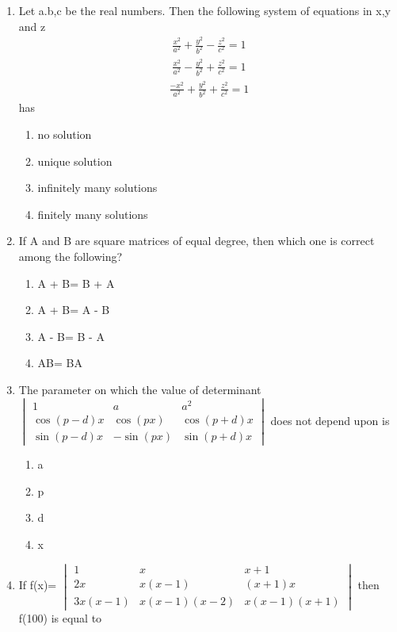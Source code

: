 \begin{enumerate}[label=\arabic*.,ref=\thesubsection.\theenumi]
 \item Let a.b,c be the real numbers. Then the following system of equations in x,y and z
 \begin{align} \frac{x^2}{a^2} +\frac{y^2}{b^2}-\frac{z^2}{c^2} = 1\end{align} 
 \begin{align} \frac{x^2}{a^2}-\frac{y^2}{b^2}+\frac{z^2}{c^2} = 1\end{align}  
 \begin{align} \frac{-x^2}{a^2}+\frac{y^2}{b^2}+\frac{z^2}{c^2} = 1\end{align} has
 \begin{enumerate}
 \item no solution
 \item unique solution
 \item infinitely many solutions 
 \item finitely many solutions
 \end{enumerate}
\item If A and B are square matrices of equal degree, then which one is correct among the following?
\begin{enumerate}
 \item A + B= B + A
 \item A + B= A - B
 \item A - B= B - A
 \item AB= BA
 \end{enumerate}
 \item The parameter on which the value of determinant $\begin{vmatrix} 1 & a & a^2  \\ \cos(p-d)x & \cos(px) & \cos(p+d)x \\ \sin(p-d)x & -\sin(px) & \sin(p+d)x \end{vmatrix}$ does not depend upon  is
 \begin{enumerate}
 \item a
 \item p
 \item d
 \item x
 \end{enumerate}
 \item If f(x)= $\begin{vmatrix} 1 & x & x+1  \\ 2x & x(x-1) & (x+1)x \\ 3x(x-1) & x(x-1)(x-2) & x(x-1)(x+1) \end{vmatrix}$ then f(100) is equal to
 \begin{enumerate}

\end{enumerate}
\end{enumerate}
